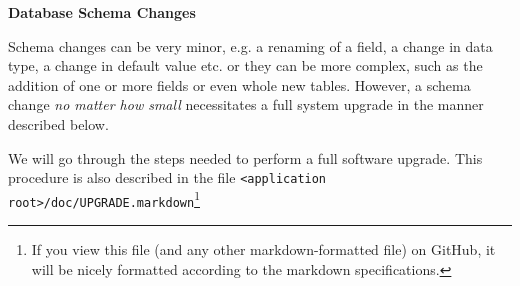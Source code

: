 \documentclass[12pt,twoside]{article}
\begin{document}
\begin{plainblock}
\begin{center}
\bfseries Database Schema Changes
\end{center}
Schema changes can be very minor, e.g. a renaming of a field, a change
in data type, a change in default value etc. or they can be more complex, 
such as the
addition of one or more fields or even whole new tables. However, a schema
change \emph{no matter how small} necessitates a full system upgrade in
the manner described below.
\end{plainblock}


We will go through the steps needed to perform a full
software upgrade. This procedure is also described in the file
\verb=<application root>/doc/UPGRADE.markdown=\footnote{If you view
this file (and any other markdown-formatted file) on GitHub, it will
be nicely formatted according to the markdown specifications.}
\end{document}
